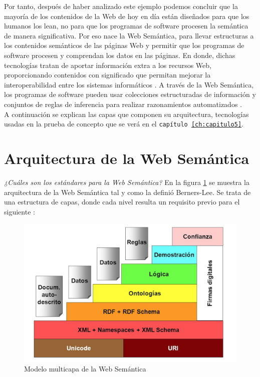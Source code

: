 
Por tanto, después de haber analizado este ejemplo podemos concluir que la mayoría de los contenidos de la Web de hoy en día están diseñados para que los humanos los lean, no para que los programas de software procesen la semántica de manera significativa. Por eso nace la Web Semántica, para llevar estructuras a los contenidos semánticos de las páginas Web y permitir que los programas de software procesen y comprendan los datos en las páginas. En donde, dichas tecnologías tratan de aportar información extra a los recursos Web, proporcionando contenidos con significado que permitan mejorar la interoperabilidad entre los sistemas informáticos \cite{aplicacion}. A través de la Web Semántica, los programas de software pueden usar colecciones estructuradas de información y conjuntos de reglas de inferencia para realizar razonamientos automatizados \cite{libro-gis}. \\

A continuación se explican las capas que componen su arquitectura, tecnologías usadas en la prueba de concepto que se verá en el \texttt{capítulo \ref{ch:capitulo5}}.



\section{Arquitectura de la Web Semántica}


\textit{¿Cuáles son los estándares para la Web Semántica?} En la figura \ref{fig:arquitectura1} se muestra la arquitectura de la Web Semántica tal y como la definió Berners-Lee. Se trata de una estructura de capas, donde cada nivel resulta un requisito previo para el siguiente \cite{researchgate}:

\begin{figure}[H]
	\centering
	\includegraphics[width=0.65\linewidth]{imagenes/capitulo3/arquitectura1} 
	\caption{Modelo multicapa de la Web Semántica \cite{researchgate}}
	\label{fig:arquitectura1}
\end{figure}


